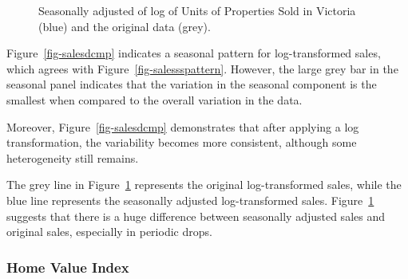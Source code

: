 \documentclass[
  11pt,
  a4paper,
]{article}
\begin{document}
\begin{figure}


\caption{\label{fig-salesssadj}Seasonally adjusted of log of Units of
Properties Sold in Victoria (blue) and the original data (grey).}

\end{figure}%

Figure~\ref{fig-salesdcmp} indicates a seasonal pattern for
log-transformed sales, which agrees with
Figure~\ref{fig-salessspattern}. However, the large grey bar in the
seasonal panel indicates that the variation in the seasonal component is
the smallest when compared to the overall variation in the data.

Moreover, Figure~\ref{fig-salesdcmp} demonstrates that after applying a
log transformation, the variability becomes more consistent, although
some heterogeneity still remains.

The grey line in Figure~\ref{fig-salesssadj} represents the original
log-transformed sales, while the blue line represents the seasonally
adjusted log-transformed sales. Figure~\ref{fig-salesssadj} suggests
that there is a huge difference between seasonally adjusted sales and
original sales, especially in periodic drops.

\subsubsection{Home Value Index}\label{home-value-index}
\end{document}

